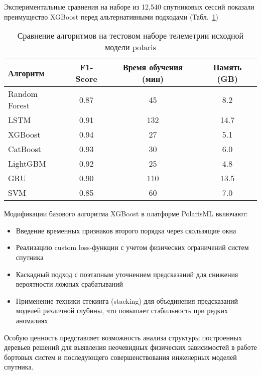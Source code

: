 Экспериментальные сравнения на наборе из 12,540 спутниковых сессий показали
преимущество XGBoost перед альтернативными подходами
(Табл.~\ref{tab:ml_comparison})

\begin{table}[h]
	\centering
	\begin{tabular}{|l|c|c|c|}
		\hline
		\textbf{Алгоритм} & \textbf{F1-Score} & \textbf{Время обучения (мин)} & \textbf{Память (GB)} \\
		\hline
		Random Forest     & 0.87              & 45                            & 8.2                  \\
		\hline
		LSTM              & 0.91              & 132                           & 14.7                 \\
		\hline
		XGBoost           & 0.94              & 27                            & 5.1                  \\
		\hline
		CatBoost          & 0.93              & 30                            & 6.0                  \\
		\hline
		LightGBM          & 0.92              & 25                            & 4.8                  \\
		\hline
		GRU               & 0.90              & 110                           & 13.5                 \\
		\hline
		SVM               & 0.85              & 60                            & 7.0                  \\
		\hline
	\end{tabular}
	\caption{Сравнение алгоритмов на тестовом наборе телеметрии исходной модели polaris}\label{tab:ml_comparison}
\end{table}

Модификации базового алгоритма XGBoost в платформе PolarisML включают:
\begin{itemize}
	\item Введение временных признаков второго порядка через скользящие окна
	\item Реализацию custom loss-функции с учетом физических ограничений систем спутника
	\item Каскадный подход с поэтапным уточнением предсказаний для снижения вероятности ложных срабатываний
	\item Применение техники стекинга (stacking) для объединения предсказаний моделей различной глубины, что повышает стабильность при редких аномалиях
\end{itemize}

Особую ценность представляет возможность анализа структуры построенных деревьев решений для выявления неочевидных физических зависимостей в работе бортовых систем и последующего совершенствования инженерных моделей спутника.



